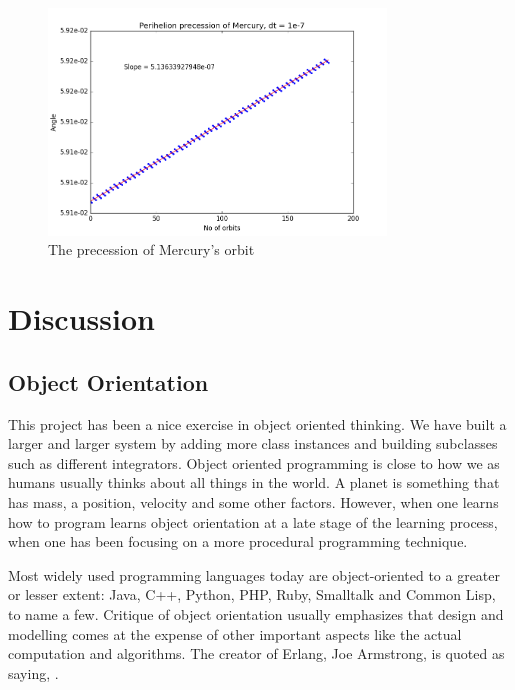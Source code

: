 \documentclass[10pt,a4paper]{amsart}
\begin{document}
\begin{figure}
	\centering
	\includegraphics[width=0.8\textwidth]{../figures/mercuryPerihelion.png}
	\caption{The precession of Mercury's orbit\label{fig:perangle}}
\end{figure}

\section{Discussion}

\subsection{Object Orientation}
This project has been a nice exercise in object oriented thinking. We have built a larger and larger system by adding more class instances and building subclasses such as different integrators. Object oriented programming is close to how we as humans usually thinks about all things in the world. A planet is something that has mass, a position, velocity and some other factors. However, when one learns how to program learns object orientation at a late stage of the learning process, when one has been focusing on a more procedural programming technique.

Most widely used programming languages today are object-oriented to a greater or lesser extent: Java, C++, Python, PHP, Ruby, Smalltalk and Common Lisp, to name a few. Critique of object orientation usually emphasizes that design and modelling comes at the expense of other important aspects like the actual computation and algorithms. The creator of Erlang, Joe Armstrong, is quoted as saying, . 
\end{document}
